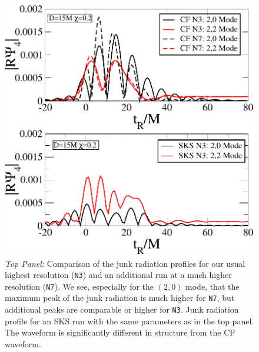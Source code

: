 \begin{figure}
  \includegraphics[scale=0.95]{chap5/HighResComparison}
  \caption[Junk radiation profiles for CF and SKS initial data.]{
{\it Top Panel:} Comparison of the junk radiation profiles for our usual
    highest resolution ({\tt N3}) and an additional run at a much higher
    resolution ({\tt N7}). We see, especially for the $(2,0)$ mode, that the
    maximum peak of the junk radiation is much higher for {\tt  N7}, but
    additional peaks are comparable or higher for {\tt N3}.  Junk radiation profile for an SKS run with the
    same parameters as in the top panel. The waveform is significantly
    different in structure from the CF waveform.
}
  \label{fig:HighResComparison}
\end{figure}

